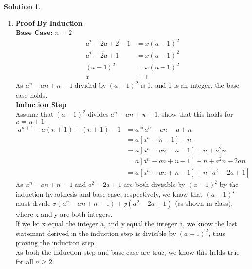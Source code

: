 \documentclass{article}
\theoremstyle{definition}
\newtheorem*{solution}{Solution}
\begin{document}
\begin{solution}\text{ \\}
\begin{enumerate}[label = \alph*)]
    \item 
    \textbf{Proof By Induction}\\
    \textbf{Base Case: $n = 2$}
    \begin{align*}
        a^2 - 2a + 2 - 1 &= x(a-1)^2\\
        a^2 - 2a + 1 &= x(a-1)^2\\
        (a-1)^2 &= x(a-1)^2\\
        x&=1
    \end{align*}
    As $a^n-an+n-1$ divided by $(a-1)^2$ is 1, and 1 is an integer, the base case holds.\\
    \textbf{Induction Step}\\
    Assume that $(a-1)^2$ divides $a^n-an+n+1$, show that this holds for $n=n+1$
    \begin{align*}
        a^{n+1}-a(n+1)+(n+1)-1 &= a*a^n-an-a+n\\
        &=a[a^n-n-1]+n\\
        &=a[a^n-an-n-1]+n+a^2n\\
        &=a[a^n-an+n-1]+n+a^2n-2an\\
        &=a[a^n-an+n-1]+n[a^2-2a+1]
    \end{align*}
    As $a^n-an+n-1$ and $a^2-2a+1$ are both divisible by $(a-1)^2$ by the induction hypothesis and base case, respectively, we know that $(a-1)^2$ must divide $x(a^n-an+n-1)+y(a^2-2a+1)$ (as shown in class), where x and y are both integers.\\
    If we let x equal the integer a, and y equal the integer n, we know the last statement derived in the induction step is divisible by $(a-1)^2$, thus proving the induction step.\\
    As both the induction step and base case are true, we know this holds true for all $n\ge2$.
    

\end{enumerate}
\end{solution}
\end{document}
